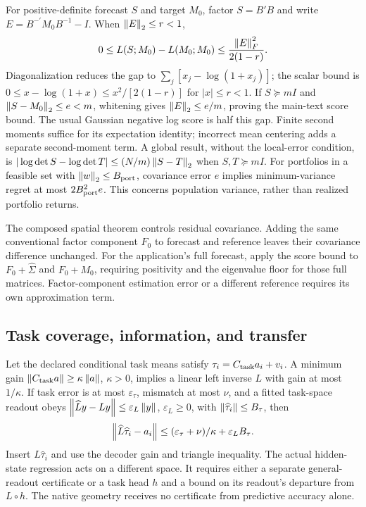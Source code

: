 \documentclass[11pt]{article}
\renewcommand{\lean}[1]{\ignorespaces}
\renewcommand{\leanok}{\ignorespaces}
\begin{document}
For positive-definite forecast $S$ and target $M_0$, factor $S=B'B$ and write
$E=B^{-\prime}M_0B^{-1}-I$. When $\left\lVert E\right\rVert_2\le r<1$,
\[
  0\le L(S;M_0)-L(M_0;M_0)\le\frac{\left\lVert E\right\rVert_F^2}{2(1-r)}.
\]
\lean{FreeFoundations.ScoreStability.loss_gap_local}\leanok{}
Diagonalization reduces the gap to
$\sum_j[x_j-\log(1+x_j)]$; the scalar bound is
$0\le x-\log(1+x)\le x^2/[2(1-r)]$ for $|x|\le r<1$.
If $S\succeq mI$ and $\left\lVert S-M_0\right\rVert_2\le e<m$, whitening gives
$\left\lVert E\right\rVert_2\le e/m$, proving the main-text score bound.
\lean{FreeFoundations.ScoreStability.loss_gap_le_of_norm_sub}\leanok{}
The usual Gaussian negative log score is half this gap. Finite second moments
suffice for its expectation identity; incorrect mean centering adds a separate
second-moment term. A global result, without the local-error condition, is
$|\log\det S-\log\det T|\le(N/m)\left\lVert S-T\right\rVert_2$ when $S,T\succeq mI$.
\lean{FreeFoundations.ScoreStability.abs_logdet_sub_le}\leanok{}
For portfolios in a feasible set with $\left\lVert w\right\rVert_2\le B_{\rm port}$, covariance
error $e$ implies minimum-variance regret at most $2B_{\rm port}^2e$.
\lean{FreeFoundations.Stability.matrix_portfolio_regret}\leanok{}
This concerns population variance, rather than realized portfolio returns.

The composed spatial theorem controls residual covariance. Adding the same
conventional factor component $F_0$ to forecast and reference leaves their
covariance difference unchanged. For the application's full forecast, apply
the score bound to $F_0+\widehat\Sigma$ and $F_0+M_0$, requiring positivity and
the eigenvalue floor for those full matrices. Factor-component estimation error
or a different reference requires its own approximation term.
\lean{FreeFoundations.EndToEnd.common_component_error,
FreeFoundations.EndToEnd.full_score_of_certificate}\leanok{}

\subsection{Task coverage, information, and transfer}\label{app:learning}
Let the declared conditional task means satisfy
$\tau_i=C_{\rm task}a_i+v_i$. A minimum gain
$\left\lVert C_{\rm task}a\right\rVert\ge\kappa\left\lVert a\right\rVert$, $\kappa>0$, implies a linear
left inverse $L$ with gain at most $1/\kappa$. If task error is at most
$\varepsilon_\tau$, mismatch at most $\nu$, and a fitted task-space readout
obeys $\left\lVert\widehat L y-Ly\right\rVert\le\varepsilon_L\left\lVert y\right\rVert$, $\varepsilon_L\ge0$, with
$\left\lVert\widehat\tau_i\right\rVert\le B_\tau$, then
\begin{equation}\label{eq:task-recovery}
  \left\lVert\widehat L\widehat\tau_i-a_i\right\rVert
  \le (\varepsilon_\tau+\nu)/\kappa+\varepsilon_L B_\tau.
\end{equation}
\lean{FreeFoundations.Recovery.exists_decoder,
  FreeFoundations.Transfer.fitted_readout_error,
FreeFoundations.EndToEnd.tasks_to_finance}\leanok{}
Insert $L\widehat\tau_i$ and use the decoder gain and triangle inequality.
The actual hidden-state regression acts on a different space. It requires either
a separate general-readout certificate or a task head $h$ and a bound on its
readout's departure from $L\circ h$. The native geometry receives no certificate
from predictive accuracy alone.
\end{document}
